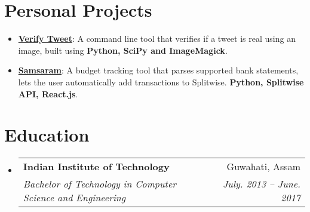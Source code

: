 \documentclass[letterpaper,11pt]{article}
\makeatletter
\newcommand{\resumeItem}[2]{
  \item\small{
    \textbf{#1}{: #2 \vspace{-2pt}}
  }
}
\newcommand{\resumeSubheading}[4]{
  \vspace{-1pt}\item
    \begin{tabular*}{0.97\textwidth}[t]{l@{\extracolsep{\fill}}r}
      \textbf{#1} & #2 \\
      \textit{\small#3} & \textit{\small #4} \\
    \end{tabular*}\vspace{-5pt}
}
\newcommand{\resumeSubItem}[2]{\resumeItem{#1}{#2}\vspace{-4pt}}
\newcommand{\resumeSubHeadingListStart}{\begin{itemize}[leftmargin=*]}
\newcommand{\resumeSubHeadingListEnd}{\end{itemize}}
\makeatother
\begin{document}
\section{Personal Projects}
\resumeSubHeadingListStart
  \resumeSubItem{\href{https://github.com/preetham/verifytweet}{Verify Tweet}}
    {A command line tool that verifies if a tweet is real using an image, built using \textbf{Python, SciPy and ImageMagick}.}
  \resumeSubItem{\href{https://github.com/preetham/samsaram-be}{Samsaram}}
    {A budget tracking tool that parses supported bank statements, lets the user automatically add transactions to Splitwise. \textbf{Python, Splitwise API, React.js}.}
\resumeSubHeadingListEnd
  
\section{Education}
  \resumeSubHeadingListStart
    \resumeSubheading
      {Indian Institute of Technology}{Guwahati, Assam}
      {Bachelor of Technology in Computer Science and Engineering}{July. 2013 -- June. 2017}
  \resumeSubHeadingListEnd
\end{document}
